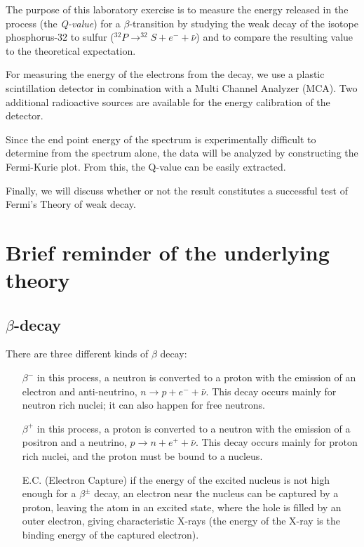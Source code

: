 \documentclass[a4,11pt, notitlepage]{article}
\begin{document}
The purpose of this laboratory exercise is to measure the energy
released in the process (the \textit{Q-value}) for a
$\beta$-transition by studying the weak decay of the isotope
phosphorus-32 to sulfur ($^{32}P\rightarrow ^{32}S + e^- + \bar{\nu}$) and to compare the
resulting value to the theoretical expectation. 

For measuring the energy of the electrons from the decay, we use a
plastic scintillation detector in combination with a Multi Channel
Analyzer (MCA). Two additional radioactive sources are available for
the energy calibration of the detector.

Since the end point energy of the spectrum is experimentally difficult
to determine from the spectrum alone, the data will be analyzed by
constructing the Fermi-Kurie plot. From this, the Q-value can be
easily extracted.

Finally, we will discuss whether or not the result constitutes a
successful test of Fermi's Theory of weak decay.

\section{Brief reminder of the underlying theory}
\subsection{$\beta$-decay}

There are three different kinds of $\beta$ decay:
\begin{itemize}
\item[$\beta^-$] in this process, a neutron is converted to a proton with the emission of an electron and anti-neutrino, $n\rightarrow p + e^- + \bar \nu$. This decay occurs mainly for neutron rich nuclei; it can also happen for free neutrons.
\item[$\beta^+$] in this process, a proton is converted to a neutron with the emission of a positron and a neutrino, $p\rightarrow n + e^+ + \bar \nu$. This decay occurs mainly for proton rich nuclei, and the proton must be bound to a nucleus.
\item[E.C.] (Electron Capture) if the energy of the excited nucleus is not high enough for a $\beta^{\pm}$ decay, an electron near the nucleus can be captured by a proton, leaving the atom in an excited state, where the hole is filled by an outer electron, giving characteristic X-rays (the energy of the X-ray is the binding energy of the captured electron).
\end{itemize}
\end{document}
